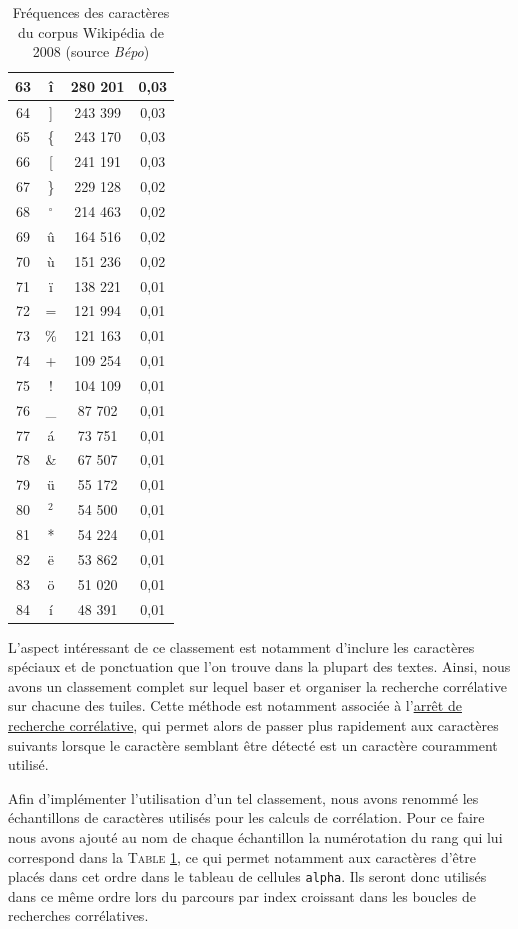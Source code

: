 \documentclass[a4paper,12pt,titlepage]{report}
\begin{document}
\begin{table}[h!]
\begin{tabular}{|c|c|c|c|}
\hline
63 & î & 	280 201 & 0,03 \\
\hline
64 & ] &	243 399 & 0,03 \\
\hline
65 &\{ &	243 170 & 0,03 \\
\hline
66 & [ &	241 191 & 0,03 \\
\hline
67 &\} &	229 128 & 0,02 \\
\hline
68 &$^\circ$&214 463& 0,02 \\
\hline
69 & û &    164 516 & 0,02 \\
\hline
70 & ù &	151 236 & 0,02 \\
\hline
71 & ï &	138 221 & 0,01 \\
\hline
72 & = &	121 994 & 0,01 \\
\hline
73 &\% &	121 163 & 0,01 \\
\hline
74 & + &	109 254 & 0,01 \\
\hline
75 & ! &	104 109 & 0,01 \\
\hline
76 &\_ &	 87 702 & 0,01 \\
\hline
77 & á &	 73 751 & 0,01 \\
\hline
78 &\& &	 67 507 & 0,01 \\
\hline
79 & ü & 	 55 172 & 0,01 \\
\hline
80 &$^2$& 	 54 500 & 0,01 \\
\hline
81 & * &	 54 224 & 0,01 \\
\hline
82 & ë & 	 53 862 & 0,01 \\
\hline
83 & ö & 	 51 020 & 0,01 \\
\hline
84 & í &	 48 391 & 0,01 \\ 
\hline
\end{tabular}
\caption{Fréquences des caractères du corpus Wikipédia de 2008 (source \textit{Bépo})}
\label{freq_carac}
\end{table}	

\newpage

L'aspect intéressant de ce classement est notamment d'inclure les caractères spéciaux et de ponctuation que l'on trouve dans la plupart des textes. Ainsi, nous avons un classement complet sur lequel baser et organiser la recherche corrélative sur chacune des tuiles. Cette méthode est notamment associée à l'\hyperref[stop_cor]{arrêt de recherche corrélative}, qui permet alors de passer plus rapidement aux caractères suivants lorsque le caractère semblant être détecté est un caractère couramment utilisé.

Afin d'implémenter l'utilisation d'un tel classement, nous avons renommé les échantillons de caractères utilisés pour les calculs de corrélation. Pour ce faire nous avons ajouté au nom de chaque échantillon la numérotation du rang qui lui correspond dans la \textsc{Table \ref{freq_carac}}, ce qui permet notamment aux caractères d'être placés dans cet ordre dans le tableau de cellules \texttt{alpha}. Ils seront donc utilisés dans ce même ordre lors du parcours par index croissant dans les boucles de recherches corrélatives.
\end{document}
